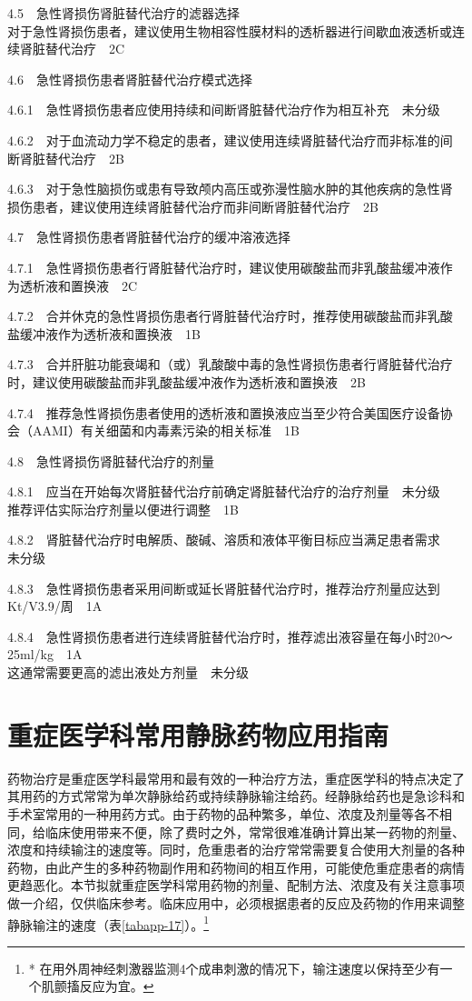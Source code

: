 4.5　急性肾损伤肾脏替代治疗的滤器选择\\
对于急性肾损伤患者，建议使用生物相容性膜材料的透析器进行间歇血液透析或连续肾脏替代治疗　2C

4.6　急性肾损伤患者肾脏替代治疗模式选择

4.6.1　急性肾损伤患者应使用持续和间断肾脏替代治疗作为相互补充　未分级

4.6.2　对于血流动力学不稳定的患者，建议使用连续肾脏替代治疗而非标准的间断肾脏替代治疗　2B

4.6.3　对于急性脑损伤或患有导致颅内高压或弥漫性脑水肿的其他疾病的急性肾损伤患者，建议使用连续肾脏替代治疗而非间断肾脏替代治疗　2B

4.7　急性肾损伤患者肾脏替代治疗的缓冲溶液选择

4.7.1　急性肾损伤患者行肾脏替代治疗时，建议使用碳酸盐而非乳酸盐缓冲液作为透析液和置换液　2C

4.7.2　合并休克的急性肾损伤患者行肾脏替代治疗时，推荐使用碳酸盐而非乳酸盐缓冲液作为透析液和置换液　1B

4.7.3　合并肝脏功能衰竭和（或）乳酸酸中毒的急性肾损伤患者行肾脏替代治疗时，建议使用碳酸盐而非乳酸盐缓冲液作为透析液和置换液　2B

4.7.4　推荐急性肾损伤患者使用的透析液和置换液应当至少符合美国医疗设备协会（AAMI）有关细菌和内毒素污染的相关标准　1B

4.8　急性肾损伤肾脏替代治疗的剂量

4.8.1　应当在开始每次肾脏替代治疗前确定肾脏替代治疗的治疗剂量　未分级\\
推荐评估实际治疗剂量以便进行调整　1B

4.8.2　肾脏替代治疗时电解质、酸碱、溶质和液体平衡目标应当满足患者需求　未分级

4.8.3　急性肾损伤患者采用间断或延长肾脏替代治疗时，推荐治疗剂量应达到Kt/V3.9/周　1A

4.8.4　急性肾损伤患者进行连续肾脏替代治疗时，推荐滤出液容量在每小时20～25ml/kg　1A\\
这通常需要更高的滤出液处方剂量　未分级

\protect\hypertarget{text00039.html}{}{}

\chapter{重症医学科常用静脉药物应用指南}

药物治疗是重症医学科最常用和最有效的一种治疗方法，重症医学科的特点决定了其用药的方式常常为单次静脉给药或持续静脉输注给药。经静脉给药也是急诊科和手术室常用的一种用药方式。由于药物的品种繁多，单位、浓度及剂量等各不相同，给临床使用带来不便，除了费时之外，常常很难准确计算出某一药物的剂量、浓度和持续输注的速度等。同时，危重患者的治疗常常需要复合使用大剂量的各种药物，由此产生的多种药物副作用和药物间的相互作用，可能使危重症患者的病情更趋恶化。本节拟就重症医学科常用药物的剂量、配制方法、浓度及有关注意事项做一介绍，仅供临床参考。临床应用中，必须根据患者的反应及药物的作用来调整静脉输注的速度（表\ref{tabapp-17}）。\footnote{* 在用外周神经刺激器监测4个成串刺激的情况下，输注速度以保持至少有一个肌颤搐反应为宜。}

